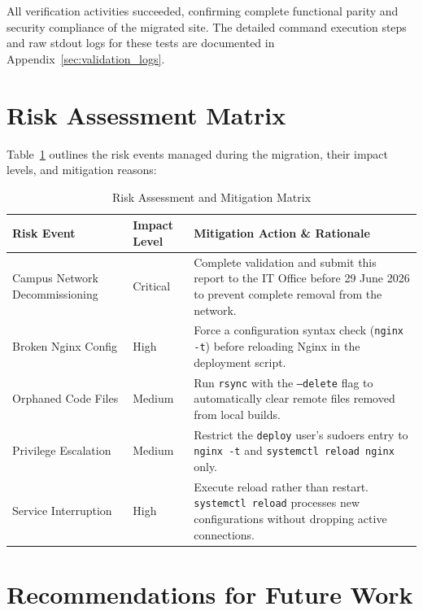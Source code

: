 \documentclass[11pt,a4paper,DIV=16,headings=normal,parskip=half]{scrartcl}
\begin{document}
All verification activities succeeded, confirming complete functional parity and security compliance of the migrated site. The detailed command execution steps and raw stdout logs for these tests are documented in Appendix~\ref{sec:validation_logs}.

\pagebreak
\section{Risk Assessment Matrix}

Table~\ref{tab:risk_matrix} outlines the risk events managed during the migration, their impact levels, and mitigation reasons:

\begin{table}[htbp]
\centering
\small
\caption{Risk Assessment and Mitigation Matrix}
\label{tab:risk_matrix}
\begin{tabular}{@{}lp{2.5cm}p{7.5cm}@{}}
\toprule
\textbf{Risk Event} & \textbf{Impact Level} & \textbf{Mitigation Action \& Rationale} \\
\midrule
Campus Network Decommissioning & Critical & Complete validation and submit this report to the IT Office before 29 June 2026 to prevent complete removal from the network. \\
Broken Nginx Config & High & Force a configuration syntax check (\texttt{nginx -t}) before reloading Nginx in the deployment script. \\
Orphaned Code Files & Medium & Run \texttt{rsync} with the \texttt{--delete} flag to automatically clear remote files removed from local builds. \\
Privilege Escalation & Medium & Restrict the \texttt{deploy} user's sudoers entry to \texttt{nginx -t} and \texttt{systemctl reload nginx} only. \\
Service Interruption & High & Execute reload rather than restart. \texttt{systemctl reload} processes new configurations without dropping active connections. \\
\bottomrule
\end{tabular}
\end{table}

\section{Recommendations for Future Work}
\end{document}
